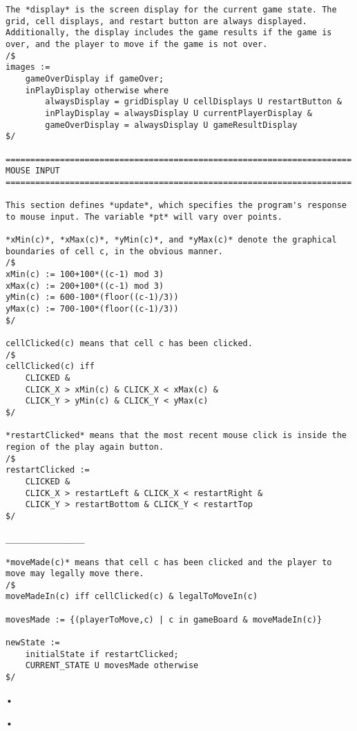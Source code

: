 \documentclass[letterpaper, 14pt]{extarticle}
\begin{document}
\begin{flushleft}
\begin{lstlisting}
The *display* is the screen display for the current game state. The grid, cell displays, and restart button are always displayed. Additionally, the display includes the game results if the game is over, and the player to move if the game is not over.
/$
images :=
    gameOverDisplay if gameOver;
    inPlayDisplay otherwise where
        alwaysDisplay = gridDisplay U cellDisplays U restartButton &
        inPlayDisplay = alwaysDisplay U currentPlayerDisplay &
        gameOverDisplay = alwaysDisplay U gameResultDisplay
$/

======================================================================
MOUSE INPUT
======================================================================

This section defines *update*, which specifies the program's response to mouse input. The variable *pt* will vary over points.

*xMin(c)*, *xMax(c)*, *yMin(c)*, and *yMax(c)* denote the graphical boundaries of cell c, in the obvious manner.
/$
xMin(c) := 100+100*((c-1) mod 3)
xMax(c) := 200+100*((c-1) mod 3)
yMin(c) := 600-100*(floor((c-1)/3))
yMax(c) := 700-100*(floor((c-1)/3))
$/

cellClicked(c) means that cell c has been clicked.
/$
cellClicked(c) iff
    CLICKED &
    CLICK_X > xMin(c) & CLICK_X < xMax(c) &
    CLICK_Y > yMin(c) & CLICK_Y < yMax(c)
$/

*restartClicked* means that the most recent mouse click is inside the region of the play again button.
/$
restartClicked :=
    CLICKED &
    CLICK_X > restartLeft & CLICK_X < restartRight &
    CLICK_Y > restartBottom & CLICK_Y < restartTop
$/

________________

*moveMade(c)* means that cell c has been clicked and the player to move may legally move there.
/$
moveMadeIn(c) iff cellClicked(c) & legalToMoveIn(c)

movesMade := {(playerToMove,c) | c in gameBoard & moveMadeIn(c)}

newState :=
    initialState if restartClicked;
    CURRENT_STATE U movesMade otherwise
$/

\end{lstlisting}•

\end{flushleft}•
\end{document}
